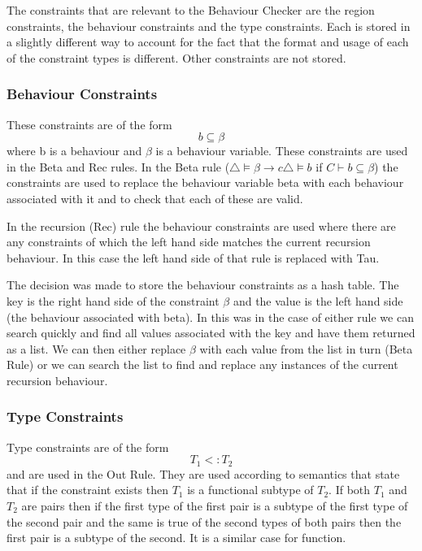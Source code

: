 The constraints that are relevant to the Behaviour Checker are the region constraints, the behaviour constraints and the type constraints. Each is stored in a slightly different way to account for the fact that the format and usage of each of the constraint types is different. Other constraints are not stored. 

\subsubsection{Behaviour Constraints}

These constraints are of the form $$b \subseteq \beta$$ where b is a behaviour and $\beta$ is a behaviour variable. These constraints are used in the Beta and Rec rules. In the Beta rule ($\bigtriangleup \models \beta \rightarrow c \bigtriangleup \models b$ if $C \vdash b \subseteq \beta$) the constraints are used to replace the behaviour variable beta with each behaviour associated with it and to check that each of these are valid. 

In the recursion (Rec) rule the behaviour constraints are used where there are any constraints of which the left hand side matches the current recursion behaviour. In this case the left hand side of that rule is replaced with Tau. 

The decision was made to store the behaviour constraints as a hash table. The key is the right hand side of the constraint $\beta$ and the value is the left hand side (the behaviour associated with beta). In this was in the case of either rule we can search quickly and find all values associated with the key and have them returned as a list. We can then either replace $\beta$ with each value from the list in turn (Beta Rule) or we can search the list to find and replace any instances of the current recursion behaviour. 

\subsubsection{Type Constraints}

Type constraints are of the form $$T_1 <: T_2$$ and are used in the Out Rule. They are used according to semantics that state that if the constraint exists then $T_1$ is a functional subtype of $T_2$. If both $T_1$ and $T_2$ are pairs then if the first type of the first pair is a subtype of the first type of the second pair and the same is true of the second types of both pairs then the first pair is a subtype of the second. It is a similar case for function. 

